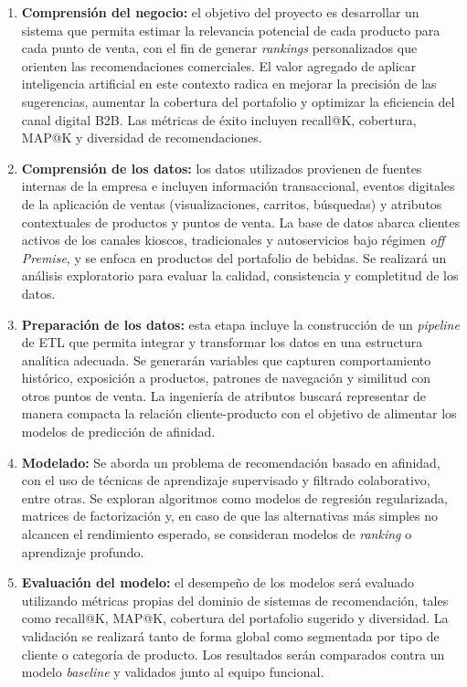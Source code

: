 \documentclass[
11pt, %
]{charter}
\begin{document}
\begin{enumerate}
\item \textbf{Comprensión del negocio:}
el objetivo del proyecto es desarrollar un sistema que permita estimar la relevancia potencial de cada producto para cada punto de venta, con el fin de generar \textit{rankings} personalizados que orienten las recomendaciones comerciales. El valor agregado de aplicar inteligencia artificial en este contexto radica en mejorar la precisión de las sugerencias, aumentar la cobertura del portafolio y optimizar la eficiencia del canal digital B2B. Las métricas de éxito incluyen recall@K, cobertura, MAP@K y diversidad de recomendaciones.

\item \textbf{Comprensión de los datos:}
los datos utilizados provienen de fuentes internas de la empresa e incluyen información transaccional, eventos digitales de la aplicación de ventas (visualizaciones, carritos, búsquedas) y atributos contextuales de productos y puntos de venta. La base de datos abarca clientes activos de los canales kioscos, tradicionales y autoservicios bajo régimen \textit{off Premise}, y se enfoca en productos del portafolio de bebidas. Se realizará un análisis exploratorio para evaluar la calidad, consistencia y completitud de los datos.

\item \textbf{Preparación de los datos:}
esta etapa incluye la construcción de un \textit{pipeline} de ETL que permita integrar y transformar los datos en una estructura analítica adecuada. Se generarán variables que capturen comportamiento histórico, exposición a productos, patrones de navegación y similitud con otros puntos de venta. La ingeniería de atributos buscará representar de manera compacta la relación cliente-producto con el objetivo de alimentar los modelos de predicción de afinidad.

\item \textbf{Modelado:}
Se aborda un problema de recomendación basado en afinidad, con el uso de técnicas de aprendizaje supervisado y filtrado colaborativo, entre otras. Se exploran algoritmos como modelos de regresión regularizada, matrices de factorización y, en caso de que las alternativas más simples no alcancen el rendimiento esperado, se consideran modelos de \textit{ranking} o aprendizaje profundo.

\item \textbf{Evaluación del modelo:}
el desempeño de los modelos será evaluado utilizando métricas propias del dominio de sistemas de recomendación, tales como recall@K, MAP@K, cobertura del portafolio sugerido y diversidad. La validación se realizará tanto de forma global como segmentada por tipo de cliente o categoría de producto. Los resultados serán comparados contra un modelo \textit{baseline} y validados junto al equipo funcional.


\end{enumerate}
\end{document}
